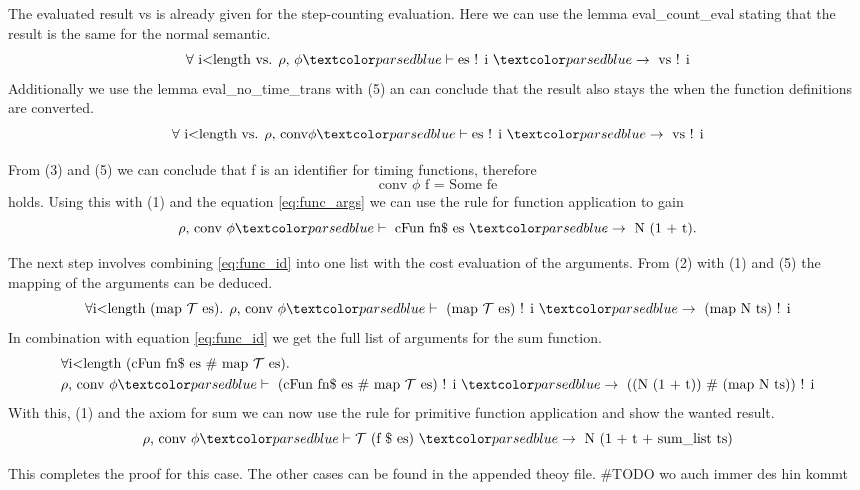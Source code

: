 The evaluated result vs is already given for the step-counting evaluation.
Here we can use the lemma eval\_count\_eval stating that the result is the same for the normal semantic.
\begin{equation*}
\forall \text{ i<length vs. } \rho \text{, } \phi \hvdash \text{es ! i } \hrightarrow \text{ vs ! i}
\end{equation*}
Additionally we use the lemma eval\_no\_time\_trans with (5) an can conclude that the result also stays the when the function definitions are converted.
\begin{equation} \label{eq:func_args}
\forall \text{ i<length vs. } \rho \text{, conv} \phi \hvdash \text{es ! i } \hrightarrow \text{ vs ! i}
\end{equation}

From (3) and (5) we can conclude that f is an identifier for timing functions, therefore
\begin{equation*}
  \text{conv } \phi \text{ f = Some fe}
\end{equation*}
holds.
Using this with (1) and the equation \ref{eq:func_args} we can use the rule for function application to gain
\begin{equation} \label{eq:func_id}
  \rho \text{, conv }\phi \hvdash \text{ cFun fn\$ es } \hrightarrow \text{ N (1 + t).}
\end{equation}

The next step involves combining \ref{eq:func_id} into one list with the cost evaluation of the arguments.
From (2) with (1) and (5) the mapping of the arguments can be deduced.
\begin{equation*}
  \forall \text{i<length (map } \mathcal{T}\text{ es). }\rho\text{, conv }\phi \hvdash\text{ (map }\mathcal{T}\text{ es) ! i }\hrightarrow \text{ (map N ts) ! i}
\end{equation*}
In combination with equation \ref{eq:func_id} we get the full list of arguments for the sum function.
\begin{equation*}
  \begin{aligned}
  &\forall \text{i<length (cFun fn\$ es \# map } \mathcal{T}\text{ es). } \\
  &\rho\text{, conv }\phi \hvdash\text{ (cFun fn\$ es \# map }\mathcal{T}\text{ es) ! i }\hrightarrow \text{ ((N (1 + t)) \# (map N ts)) ! i}
  \end{aligned}
\end{equation*}
With this, (1) and the axiom for sum we can now use the rule for primitive function application and show the wanted result.
\begin{equation*}
  \rho \text{, conv } \phi \hvdash \mathcal{T}\text{ (f \$ es) }\hrightarrow\text{ N (1 + t + sum\_list ts)}
\end{equation*}

This completes the proof for this case.
The other cases can be found in the appended theoy file. \#TODO wo auch immer des hin kommt

